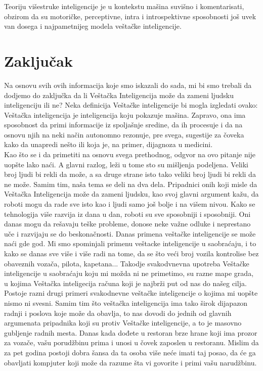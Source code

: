 \documentclass[a4paper]{article}
\begin{document}
Teoriju višestruke inteligencije je u kontekstu mašina suvišno i komentarisati, obzirom da su motoričke, perceptivne, intra i introspektivne sposobnosti još uvek van dosega i najpametnijeg modela veštačke inteligencije.
\newpage

\section{Zaključak}
\label{sec:zakljucak}

Na osnovu svih ovih informacija koje smo iskazali do sada, mi bi smo trebali da dodjemo do zaključka da li Veštačka Inteligencija može da zameni ljudsku inteligenciju ili ne? Neka definicija Veštačke inteligencije bi mogla izgledati ovako: Veštačka inteligencija je inteligencija koju pokazuje mašina. Zapravo, ona ima sposobnost da primi informacije iz spoljašnje sredine, da ih procesuje i da na osnovu njih na neki način autonomno rezonuje, pre svega, sugestije za čoveka kako da unapredi nešto ili koja je, na primer, dijagnoza u medicini.\\
Kao što se i da primetiti na osnovu svega prethodnog, odgvor na ovo pitanje nije uopšte lako naći. A glavni razlog, leži u tome sto su mišljenja podeljena. Veliki broj ljudi bi rekli da može, a sa druge strane isto tako veliki broj ljudi bi rekli da ne može. Samim tim, naša tema se deli na dva dela. Pripadnici onih koji misle da Veštačka Inteligencija može da zameni ljudsku, kao svoj glavni argument kažu, da roboti mogu da rade sve isto kao i ljudi samo još bolje i na višem nivou. Kako se tehnologija više razvija iz dana u dan, roboti su sve sposobniji i sposobniji. Oni danas mogu da rešavaju teške probleme, donose neke važne odluke i neprestano uče i razvijaju se do beskonačnosti. Danas primena veštačke inteligencije se može naći gde god. Mi smo spominjali primenu veštacke inteligencije u saobraćaju, i to kako se danas sve više i više radi na tome, da se što veći broj vozila kontrolise bez obaveznih vozača, pilota, kapetana... Takodje svakodvnevna upotreba Veštačke inteligencije u saobraćaju koju mi možda ni ne primetimo, su razne mape grada, u kojima Veštačka inteligecija računa koji je najbrži put od nas do našeg cilja. Postoje razni drugi primeri svakodnevne veštačke inteligencije o kojima mi uopšte nismo ni svesni. Samim tim što veštačka inteligencija ima tako širok dijapazon radnji i poslova koje može da obavlja, to nas dovodi do jednih od glavnih argumenata pripadnika koji su protiv Veštačke inteligencije, a to je masovno gubljenje radnih mesta. Danas kada dođete u restoran brze hrane koji ima prozor za vozače, vašu porudžbinu prima i unosi u čovek zaposlen u restoranu. Mislim da za pet godina postoji dobra šansa da ta osoba više neće imati taj posao, da će ga obavljati kompjuter koji može da razume šta vi govorite i primi vašu narudžbinu.\\
\end{document}
